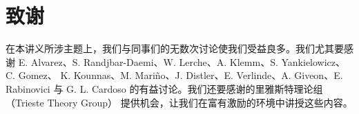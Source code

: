 \section*{致谢}

在本讲义所涉主题上，我们与同事们的无数次讨论使我们受益良多。我们尤其要感谢
E. Alvarez、S. Randjbar-Daemi、W. Lerche、A. Klemm、S. Yankielowicz、C. Gomez、
K. Kounnas、M. Mari\~no、J. Distler、E. Verlinde、A. Giveon、E. Rabinovici 与
G. L. Cardoso 的有益讨论。我们还要感谢的里雅斯特理论组（Trieste Theory Group）
提供机会，让我们在富有激励的环境中讲授这些内容。

